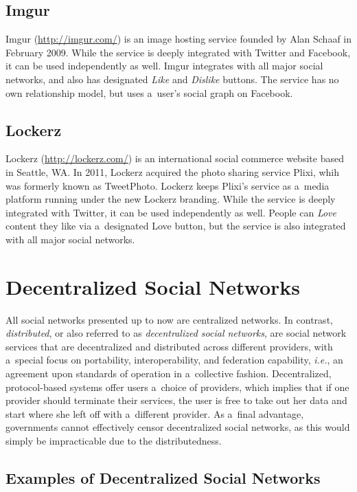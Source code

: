 \subsection{Imgur}

Imgur (\url{http://imgur.com/})
is an image hosting service
founded by Alan Schaaf in February 2009.
While the service is deeply integrated with Twitter
and Facebook, it can be used independently as well.
Imgur integrates with all major social networks,
and also has designated \emph{Like} and \emph{Dislike} buttons.
The service has no own relationship model,
but uses a~user's social graph on Facebook.

\subsection{Lockerz}

Lockerz (\url{http://lockerz.com/}) is an international
social commerce website based in Seattle, WA. 
In 2011, Lockerz acquired the photo sharing service Plixi,
whih was formerly known as TweetPhoto.
Lockerz keeps Plixi's service as a~media platform running
under the new Lockerz branding.
While the service is deeply integrated with Twitter,
it can be used independently as well.
People can \emph{Love} content they like via
a~designated Love button,
but the service is also integrated with all major social networks.

\section{Decentralized Social Networks}
All social networks presented up to now are centralized networks.
In contrast, \emph{distributed}, or also referred to as
\emph{decentralized social networks}, are
social network services that are decentralized and distributed
across different providers, with a~special focus on
portability, interoperability, and federation capability,
\emph{i.e.}, an agreement upon standards of operation
in a~collective fashion.
Decentralized, protocol-based systems
offer users a~choice of providers, which implies
that if one provider should terminate their services,
the user is free to take out her data and start
where she left off with a~different provider.
As a~final advantage, governments cannot effectively censor
decentralized social networks,
as this would simply be impracticable due to the distributedness.

\subsection{Examples of Decentralized Social Networks}

